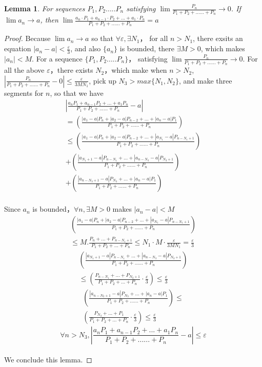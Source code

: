 \documentclass[10pt,journal,letterpaper,compsoc]{IEEEtran}
\newtheorem{lemma}[thm]{Lemma}
\begin{document}
\begin{CJK}{UTF8}{gkai}
\begin{lemma}
For sequences $P_1,P_2.....P_n$
satisfying $ \lim \frac{P_n}{P_1+P_2+......+P_n} \rightarrow 0 $.
If $\lim a_n \rightarrow a$,
then $\lim \frac{a_n \cdot P_1+a_{n-1} \cdot P_2+...+a_1\cdot P_n}{P_1+P_2+......+P_n}=a$
\end{lemma}

\begin{proof}
Because $\lim a_n \rightarrow a$
so that $\forall \varepsilon,\exists N_1$，
for all $n>N_1$, there exsits an equation 
$|a_n-a|<\frac{\varepsilon}{3}$,
and also $\{a_n\}$ is bounded, there $\exists M>0$, which makes $|a_n|<M$.
For a sequence $\{P_1,P_2.....P_n\}$，
satisfying $\lim \frac{P_n}{P_1+P_2+......+P_n} \rightarrow 0$.
For all the above $\varepsilon$，there exists $N_2$，which make when $n>N_2$,
$|\frac{P_n}{P_1+P_2+......+P_n}-0| \leq \frac{\varepsilon}{3MN_1}$,
pick up $N_3>max\{N_1,N_2\}$,
and make three segments for $n$, so that we have 
\begin{eqnarray*}
| \frac{a_n P_1+a_{n-1} P_2+...+a_1 P_n}{P_1+P_2+......+P_n}-a| \\
=( \frac{|a_1-a| P_n+|a_2-a| P_{n-2}+...+|a_n-a| P_1}{P_1+P_2+......+P_n})\\
\leq ( \frac{|a_1-a| P_n+|a_2-a| P_{n-2}+...+|a_{N_1}-a| P_{n-N_1+1}}{P_1+P_2+......+P_n})\\
+ ( \frac{|a_{N_1+1}-a| P_{n-N_1}+...+|a_{n-N_3}-a|  P_{N_3+1}}{P_1+P_2+......+P_n})\\
+ ( \frac{|a_{n-N_3+1}-a|  P_{N_3}+...+|a_{n}-a| P_1}{P_1+P_2+......+P_n})       
\end{eqnarray*}
\\Since ${a_n}$ is bounded，$\forall n,\exists M>0$
makes $|a_n-a|<M$
\begin{eqnarray*}
( \frac{|a_1-a| P_n+|a_2-a| P_{n-2}+...+|a_{N_1}-a| P_{n-N_1+1}}{P_1+P_2+......+P_n})\\
\leq M.\frac{P_n+...+P_{n-N_1+1}}{P_1+P_2+...+P_n} \leq N_1 \cdot M \cdot \frac{\varepsilon}{3MN_1}
=\frac{\varepsilon}{3}
\end{eqnarray*}
\begin{eqnarray*}
( \frac{|a_{N_1+1}-a| P_{n-N_1}+...+|a_{n-N_3}-a|  P_{N_3+1}}{P_1+P_2+......+P_n})\\
    \leq(\frac{P_{n-N_1}+...+P_{N_3+1}}{P_1+P_2+...+P_n}
\cdot \frac{\varepsilon}{3})
    \leq \frac{\varepsilon}{3}
\end{eqnarray*}
\begin{eqnarray*}
( \frac{|a_{n-N_3+1}-a|  P_{N_3}+...+|a_{n}-a| P_1}{P_1+P_2+......+P_n}) \leq \\
(\frac{P_{N_3}+...+P_1}{P_1+P_2+...+P_n} \cdot \frac{\varepsilon}{3}) \leq \frac{\varepsilon}{3}
\end{eqnarray*}
\begin{equation}  
 \forall n>N_3, | \frac{a_n P_1+a_{n-1} P_2+...+a_1 P_n}{P_1+P_2+......+P_n}-a|\leq \varepsilon 
\end{equation}
\\We conclude this lemma. 
\end{proof}


\end{CJK}
\end{document}
